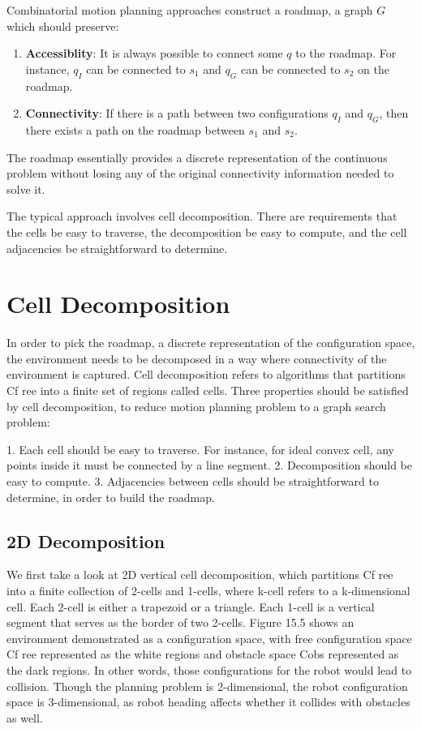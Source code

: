 \documentclass[twoside]{article}
\begin{document}
Combinatorial motion planning approaches construct a roadmap, a graph $G$ which should preserve:

\begin{enumerate}
	\item \textbf{Accessiblity}: It is always possible to connect some $q$ to the roadmap. For instance, $q_I$ can be connected to $s_1$ and $q_G$ can be connected to $s_2$ on the roadmap.
	\item \textbf{Connectivity}: If there is a path between two configurations $q_I$ and $q_G$, then there exists a path on the roadmap between $s_1$ and $s_2$.
\end{enumerate}

The roadmap essentially provides a discrete representation of the continuous problem without losing any of the original connectivity information needed to solve it.

The typical approach involves cell decomposition. There are requirements that the cells be easy to traverse, the decomposition be easy to compute, and the cell adjacencies be straightforward to determine.

\section{Cell Decomposition}
In order to pick the roadmap, a discrete representation of the configuration space, the environment needs to be decomposed in a way where connectivity of the environment is captured. Cell decomposition refers to algorithms that partitions Cf ree into a finite set of regions called cells. Three properties should be satisfied by cell decomposition, to reduce motion planning problem to a graph search problem:

1. Each cell should be easy to traverse. For instance, for ideal convex cell, any points inside it must be connected by a line segment.
2. Decomposition should be easy to compute.
3. Adjacencies between cells should be straightforward to determine, in order to build the roadmap.

\subsection{2D Decomposition}
We first take a look at 2D vertical cell decomposition, which partitions Cf ree into a finite collection of 2-cells and 1-cells, where k-cell refers to a k-dimensional cell. Each 2-cell is either a trapezoid or a triangle.
Each 1-cell is a vertical segment that serves as the border of two 2-cells. Figure 15.5 shows an environment demonstrated as a configuration space, with free configuration space Cf ree represented as the white regions and obstacle space Cobs represented as the dark regions. In other words, those configurations for the robot would lead to collision. Though the planning problem is 2-dimensional, the robot configuration space is 3-dimensional, as robot heading affects whether it collides with obstacles as well.
\end{document}
